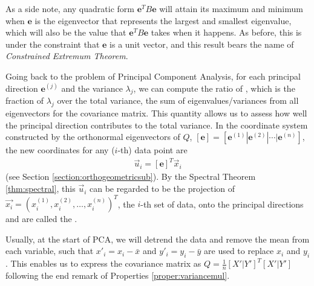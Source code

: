 As a side note, any quadratic form $\textbf{e}^TB\textbf{e}$ will attain its maximum and minimum when $\textbf{e}$ is the eigenvector that represents the largest and smallest eigenvalue, which will also be the value that $\textbf{e}^TB\textbf{e}$ takes when it happens. As before, this is under the constraint that $\textbf{e}$ is a unit vector, and this result bears the name of \textit{Constrained Extremum Theorem}.\par
Going back to the problem of Principal Component Analysis, for each principal direction $\textbf{e}^{(j)}$ and the variance $\lambda_{j}$, we can compute the ratio of , which is the fraction of $\lambda_{j}$ over the total variance, the sum of eigenvalues/variances from all eigenvectors for the covariance matrix. This quantity allows us to assess how well the principal direction contributes to the total variance. In the coordinate system constructed by the orthonormal eigenvectors of $Q$, $[\textbf{e}] = [\textbf{e}^{(1)}|\textbf{e}^{(2)}|\cdots|\textbf{e}^{(n)}]$, the new coordinates for any ($i$-th) data point are \begin{align}
\vec{u}_i = [\textbf{e}]^T \vec{x}_i \label{eqn:PCAcoordchange} 
\end{align} (see Section \ref{section:orthogeometricsub}). By the Spectral Theorem \ref{thm:spectral}, this $\vec{u}_i$ can be regarded to be the projection of $\vec{x_i} = (x_i^{(1)}, x_i^{(2)}, \ldots, x_i^{(n)})^T$, the $i$-th set of data, onto the principal directions and are called the . \par
Usually, at the start of PCA, we will detrend the data and remove the mean from each variable, such that $x'_i = x_i - \bar{x}$ and $y'_i = y_i - \bar{y}$ are used to replace $x_i$ and $y_i$. This enables us to express the covariance matrix as $Q = \frac{1}{n}[X'|Y']^T[X'|Y']$ following the end remark of Properties \ref{proper:variancemul}. 
